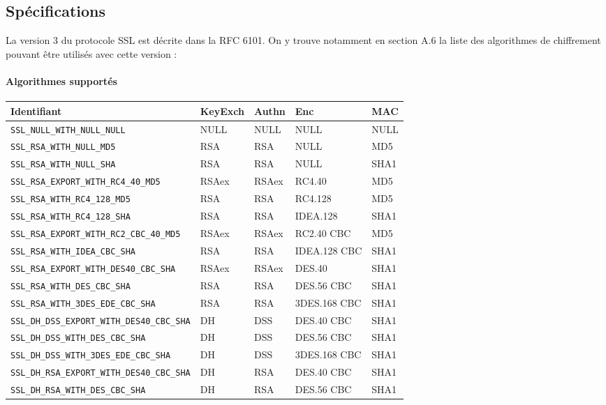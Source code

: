 \documentclass[a4paper,11pt,french]{article}
\begin{document}
\subsection{Spécifications}
La version 3 du protocole SSL est décrite dans la RFC 6101. On y trouve notamment en section A.6 la liste des algorithmes de chiffrement pouvant être utilisés avec cette version :

\paragraph{Algorithmes supportés} 
\begin{center}
\begin{tabularx}{17cm}{|l|l|l|X|l|}
\hline
\textbf{Identifiant} & \textbf{KeyExch} & \textbf{Authn}& \textbf{Enc}& \textbf{MAC}\\
\hline
\verb+SSL_NULL_WITH_NULL_NULL+&NULL&NULL&NULL&NULL\\
\hline
\verb+SSL_RSA_WITH_NULL_MD5+&RSA&RSA&NULL&MD5\\
\hline 
\verb+SSL_RSA_WITH_NULL_SHA+&RSA&RSA&NULL&SHA1\\
\hline 
\verb+SSL_RSA_EXPORT_WITH_RC4_40_MD5+&RSAex&RSAex&RC4.40&MD5\\
\hline
\verb+SSL_RSA_WITH_RC4_128_MD5+&RSA&RSA&RC4.128&MD5\\
\hline
\verb+SSL_RSA_WITH_RC4_128_SHA+ &RSA&RSA&IDEA.128&SHA1\\
\hline
\verb+SSL_RSA_EXPORT_WITH_RC2_CBC_40_MD5+&RSAex&RSAex&RC2.40 CBC&MD5 \\
\hline
\verb+SSL_RSA_WITH_IDEA_CBC_SHA+& RSA&RSA&IDEA.128 CBC&SHA1\\
\hline
\verb+SSL_RSA_EXPORT_WITH_DES40_CBC_SHA+&RSAex&RSAex&DES.40&SHA1\\
\hline
\verb+SSL_RSA_WITH_DES_CBC_SHA+& RSA&RSA&DES.56 CBC&SHA1\\
\hline
\verb+SSL_RSA_WITH_3DES_EDE_CBC_SHA+& RSA&RSA&3DES.168 CBC&SHA1\\
\hline
\verb+SSL_DH_DSS_EXPORT_WITH_DES40_CBC_SHA+&DH&DSS&DES.40 CBC&SHA1\\
\hline
\verb+SSL_DH_DSS_WITH_DES_CBC_SHA+ & DH&DSS&DES.56 CBC&SHA1\\
\hline 
\verb+SSL_DH_DSS_WITH_3DES_EDE_CBC_SHA+ & DH&DSS&3DES.168 CBC&SHA1\\
\hline
\verb+SSL_DH_RSA_EXPORT_WITH_DES40_CBC_SHA+ & DH&RSA&DES.40 CBC&SHA1\\
\hline
\verb+SSL_DH_RSA_WITH_DES_CBC_SHA+ & DH&RSA&DES.56 CBC&SHA1\\

\end{tabularx}
\end{center}
\end{document}

